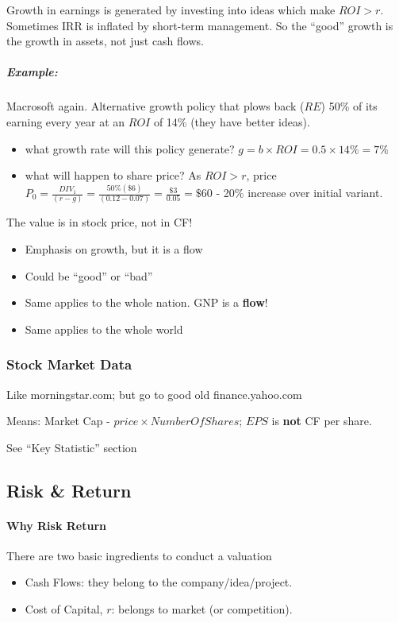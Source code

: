 \documentclass{scrartcl}
\newcommand{\example}{\subparagraph{Example:}} %
\begin{document}
Growth in earnings is generated by investing into ideas which make $ROI > r$.
Sometimes IRR is inflated by short-term management. So the ``good'' growth is
the growth in assets, not just cash flows.

\example Macrosoft again. Alternative growth policy that plows back ($RE$) 50\%
of its earning every year at an $ROI$ of 14\% (they have better ideas).
\begin{itemize}
\item what growth rate will this policy generate? $g = b \times ROI = 0.5 \times
  14\% = 7\%$
\item what will happen to share price? As $ROI > r$, price $P_0 =
  \frac{DIV_1}{(r-g)} = \frac{50\% (\$6)}{(0.12-0.07)} = \frac{\$3}{0.05} =
  \$60$ - 20\% increase over initial variant.
\end{itemize}
The value is in stock price, not in CF!
\begin{itemize}
\item Emphasis on growth, but it is a flow
\item Could be ``good'' or ``bad''
\item Same applies to the whole nation. GNP is a {\bf flow}!
\item Same applies to the whole world
\end{itemize}

\subsubsection{Stock Market Data}
\label{sec:StockMarketData}

Like morningstar.com; but go to good old finance.yahoo.com

Means: Market Cap - $price \times NumberOfShares$; $EPS$ is {\bf not} CF per
share.

See ``Key Statistic'' section

\subsection{Risk \& Return}
\label{sec:Risk}

\paragraph{Why Risk Return} There are two basic ingredients to conduct a
valuation
\begin{itemize}
\item Cash Flows: they belong to the company/idea/project.
\item Cost of Capital, $r$: belongs to market (or competition).
\end{itemize}
\end{document}

